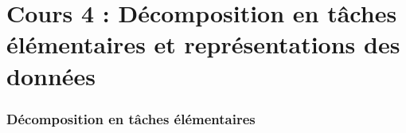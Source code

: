 \documentclass[../allslides.tex]{subfiles}
\renewcommand\titlepagesubtitle{Cours 4 : Décomposition en tâches élémentaires et représentations des données}
\begin{document}
\part{\titlepagesubtitle{}}

\begin{frame}[plain]
	\partpage %
\end{frame}



\section{Décomposition en tâches élémentaires}
\end{document}
